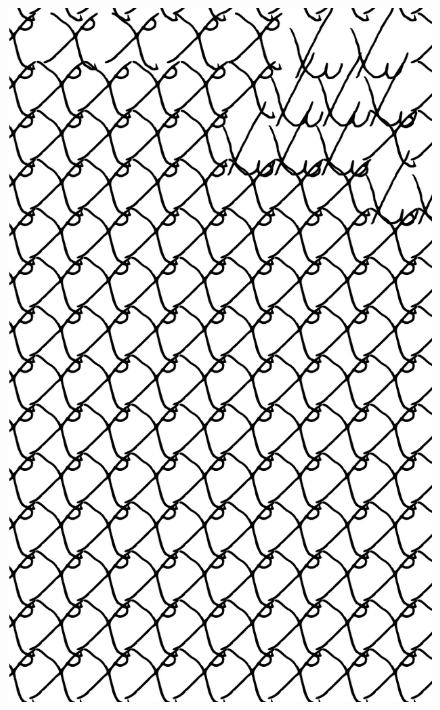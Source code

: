 \makeatletter\@openrightfalse
\movetooddpage
\begin{absolutelynopagebreak}
\begin{vplace}
\begin{figure}[H]
\begin{adjustwidth}{-0.99cm}{}
  \centering
  \vspace*{-1.97cm}
  \hspace*{-0.65cm}
  \includegraphics[width=115mm]{./imgs/img3.pdf}  
  \hfill
\end{adjustwidth}

\thispagestyle{empty}

\end{figure}
\end{vplace}

\end{absolutelynopagebreak}

